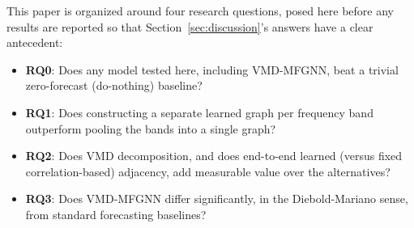 \documentclass[journal]{IEEEtran}
\begin{document}
This paper is organized around four research questions, posed here before any results are reported so that Section~\ref{sec:discussion}'s answers have a clear antecedent:
\begin{itemize}
    \item \textbf{RQ0}: Does any model tested here, including VMD-MFGNN, beat a trivial zero-forecast (do-nothing) baseline?
    \item \textbf{RQ1}: Does constructing a separate learned graph per frequency band outperform pooling the bands into a single graph?
    \item \textbf{RQ2}: Does VMD decomposition, and does end-to-end learned (versus fixed correlation-based) adjacency, add measurable value over the alternatives?
    \item \textbf{RQ3}: Does VMD-MFGNN differ significantly, in the Diebold-Mariano sense, from standard forecasting baselines?
\end{itemize}
\end{document}

